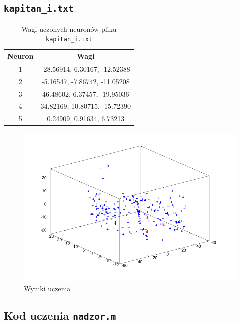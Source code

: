 \documentclass[pointlessnumbers, abstracton, headsepline, a4paper]{scrartcl}
\begin{document}
\clearpage
\subsection{\texttt{kapitan\_i.txt}}

\begin{table}[h]
\centering
\begin{tabular}[t]{c|c}
Neuron & Wagi \\
\hline
1&  -28.56914,    6.30167,  -12.52388 \\
2&   -5.16547,   -7.86742,  -11.05208 \\
3&   46.48602,    6.37457,  -19.95036 \\
4&   34.82169,   10.80715,  -15.72390 \\
5&    0.24909,    0.91634,    6.73213 \\
\end{tabular}
\caption{\label{tab:xor}Wagi uczonych neuronów pliku \texttt{kapitan\_i.txt}}
\end{table}

\begin{figure}[!h]
\centering
\includegraphics[scale=1.0]{src/mykapitan_i.pdf}\caption{\label{fig:dane1}Wyniki uczenia}
\end{figure}

\clearpage
\subsection{Kod uczenia \texttt{nadzor.m}}
\label{sec:nadzor}
\begin{center}
\lstset{captionpos=b,caption=Kod uczenia konkurencyjnego,label=lst:nadzor}

\end{center}
\end{document}
